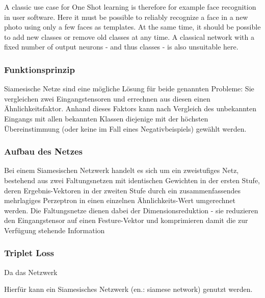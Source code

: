 A classic use case for One Shot learning is therefore for example face recognition in user software. Here it must be possible to reliably recognize a face in a new photo using only a few faces as templates. At the same time, it should be possible to add new classes or remove old classes at any time. A classical network with a fixed number of output neurons - and thus classes - is also unsuitable here.



	\subsubsection{Funktionsprinzip}
		Siamesische Netze sind eine mögliche Lösung für beide genannten Probleme: Sie vergleichen zwei Eingangstensoren und errechnen aus diesen einen Ähnlichkeitsfaktor. Anhand dieses Faktors kann nach Vergleich des unbekannten Eingangs mit allen bekannten Klassen diejenige mit der höchsten Übereinstimmung (oder keine im Fall eines Negativbeispiels) gewählt werden.
		
	\subsubsection{Aufbau des Netzes}
	 Bei einem Siamesischen Netzwerk handelt es sich um ein zweistufiges Netz, bestehend aus zwei Faltungsnetzen mit identischen Gewichten in der ersten Stufe, deren Ergebnis-Vektoren in der zweiten Stufe durch ein zusammenfassendes mehrlagiges Perzeptron in einen einzelnen Ähnlichkeits-Wert umgerechnet werden.
	 Die Faltungsnetze dienen dabei der Dimensionsreduktion - sie reduzieren den Eingangstensor auf einen Festure-Vektor und komprimieren damit die zur Verfügung stehende Information 
	 
	 
	 
%	 	
	 
	 	 \subsubsection{Triplet Loss}
	 Da das Netzwerk 
	 
	 
	 
	 Hierfür kann ein Siamesisches Netzwerk (en.: siamese network) genutzt werden. 



